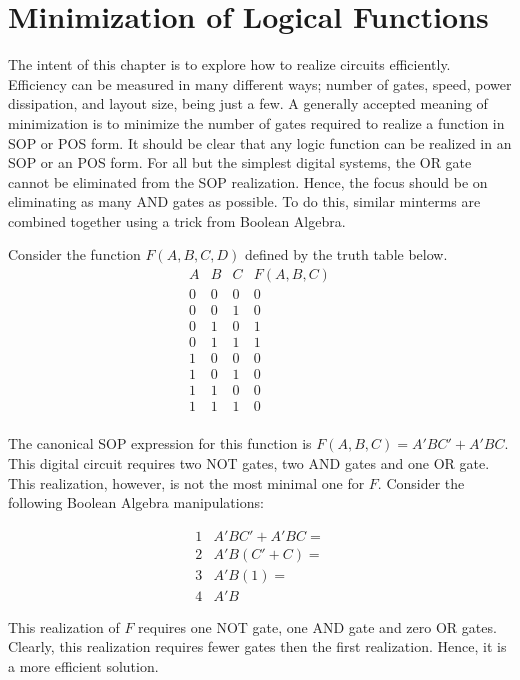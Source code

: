 \chapter{Minimization of Logical Functions}
\label{chapter:Minimization of Logical Functions}
\graphicspath{ {./chapter03/Fig} }

The intent of this chapter is to explore how to realize 
circuits efficiently.  Efficiency can be measured in
many different ways; number of gates, speed, power
dissipation, and layout size, being just a few. A generally
accepted meaning of minimization is to 
 minimize the number of gates required to realize 
a function in SOP or POS form.  It should be clear that
any logic function can be realized in an SOP or an POS form.
For all but the simplest digital systems, the OR gate cannot 
be eliminated from the SOP realization.  Hence, the focus should 
be on eliminating as many AND gates as possible.
To do this, similar minterms are combined together 
using a trick from Boolean Algebra.

Consider the function $F(A,B,C,D)$ defined by the truth table
below.
$$\begin{array}{c|c|c||c}
A & B & C & F(A,B,C)  \\ \hline
0 & 0 & 0 & 0 \\ \hline
0 & 0 & 1 & 0 \\ \hline
0 & 1 & 0 & 1 \\ \hline
0 & 1 & 1 & 1 \\ \hline
1 & 0 & 0 & 0 \\ \hline
1 & 0 & 1 & 0 \\ \hline
1 & 1 & 0 & 0 \\ \hline
1 & 1 & 1 & 0 \\
\end{array} $$

The canonical SOP expression for this function is $F(A,B,C)=A'BC' + A'BC$.  
This digital circuit requires two NOT gates, two AND gates and one OR gate.  
This realization, however, is not the most minimal one for $F$.  Consider 
the following Boolean Algebra manipulations:

$$\begin{array}{cl}
1 & A'BC' + A'BC = \\
2 & A'B(C' + C) = \\
3 & A'B(1) = \\
4 & A'B
\end{array}$$

This realization of $F$ requires one NOT gate, one AND gate and 
zero OR gates.  Clearly, this realization requires fewer gates then the
first realization.  Hence, it is a more efficient solution.

